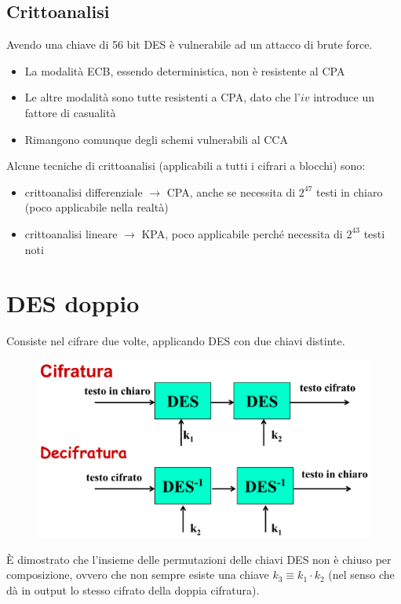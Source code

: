 \subsection{Crittoanalisi}

Avendo una chiave di 56 bit DES è vulnerabile ad un attacco di brute force. 

\begin{itemize}
    \item La modalità ECB, essendo deterministica, non è resistente al CPA 
    \item Le altre modalità sono tutte resistenti a CPA, dato che l'$iv$ introduce 
    un fattore di casualità
    \item Rimangono comunque degli schemi vulnerabili al CCA 
\end{itemize}

\noindent Alcune tecniche di crittoanalisi (applicabili a tutti i cifrari a blocchi) sono:
\begin{itemize}
    \item crittoanalisi differenziale $\rightarrow$ CPA, anche se necessita di $2^{47}$ 
    testi in chiaro (poco applicabile nella realtà)
    \item crittoanalisi lineare $\rightarrow$ KPA, poco applicabile perché necessita di $2^{43}$ testi noti
\end{itemize}


\section{DES doppio}

Consiste nel cifrare due volte, applicando DES con due chiavi distinte. 

\begin{figure}[H]
    \centering
    \includegraphics[width=0.8\linewidth]{chapters/chap03/images/des-d.png}
\end{figure}

\noindent È dimostrato che l'insieme delle permutazioni delle chiavi DES non 
è chiuso per composizione, ovvero che non sempre esiste una chiave $k_3 \equiv k_1 \cdot k_2$ (nel 
senso che dà in output lo stesso cifrato della doppia cifratura).

